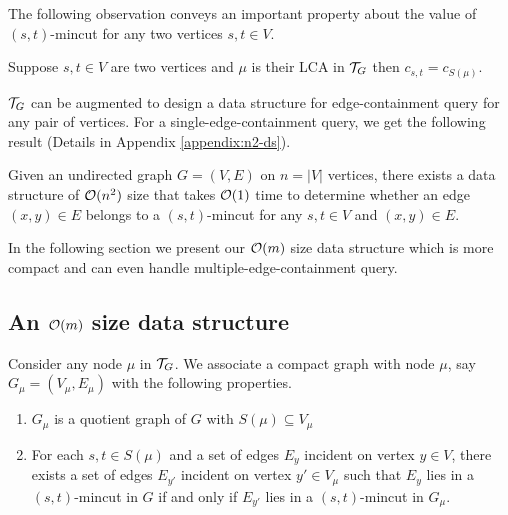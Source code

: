 The following observation conveys an important property about the value of $(s,t)$-mincut for any two vertices $s,t\in V$.

\begin{observation}
\label{obs:(s,t)-mincut-lca}
Suppose $s,t \in V$ are two vertices and $\mu$ is their LCA in ${\cal T}_G$ then $c_{s,t}=c_{S(\mu)}$.
\end{observation}



${\cal T}_G$ can be augmented to design a data structure for edge-containment query for any pair of vertices. For a single-edge-containment query, we get the following result (Details in Appendix \ref{appendix:n2-ds}).

\begin{theorem}
 Given an undirected graph $G=(V,E)$ on $n=|V|$ vertices, there exists a data structure of 
 ${\cal O}(n^2)$ size that takes ${\cal O}(1)$ time to determine whether an edge $(x,y)\in E$
 belongs to a $(s,t)$-mincut for any $s,t\in V$
 and $(x,y)\in E$.
 \label{thm:O(n^2)-size-data-structure}
 \end{theorem}

In the following section we present our ${\cal O}(m)$ size data structure which is more compact and can even handle multiple-edge-containment query.


\subsection{An \texorpdfstring{${\cal O}(m)$}{O(m)} size data structure}

Consider any node $\mu$ in ${\cal T}_G$. We associate a compact graph with node $\mu$, say $G_\mu=(V_\mu,E_\mu)$ with the following properties. 

\begin{enumerate}
    \item $G_\mu$ is a quotient graph of $G$ with $S(\mu)\subseteq V_\mu$
    \item  For each $s,t\in S(\mu)$ and a set of edges $E_y$ incident on vertex $y\in V$, there exists a set of edges $E_{y'}$ incident on vertex $y'\in V_\mu$ such that $E_y$ lies in a $(s,t)$-mincut in $G$ if and only if $E_{y'}$ lies in a $(s,t)$-mincut in $G_\mu$.
\end{enumerate}


